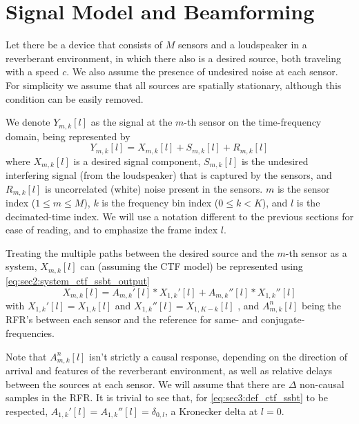 \section{Signal Model and Beamforming}
\label{sec:signal_model}

Let there be a device that consists of $M$ sensors and a loudspeaker in a reverberant environment, in which there also is a desired source, both traveling with a speed $c$. We also assume the presence of undesired noise at each sensor. For simplicity we assume that all sources are spatially stationary, although this condition can be easily removed.

We denote $Y_{m,k}[l]$ as the signal at the $m$-th sensor on the time-frequency domain, being represented by
\begin{equation}
	\label{eq:sec3:system_time-freq_domain_base}
	Y_{m,k}[l] = X_{m,k}[l] + S_{m,k}[l] + R_{m,k}[l]
\end{equation}
where $X_{m,k}[l]$ is a desired signal component, $S_{m,k}[l]$ is the undesired interfering signal (from the loudspeaker) that is captured by the sensors, and $R_{m,k}[l]$ is uncorrelated (white) noise present in the sensors. $m$ is the sensor index ($1 \leq m \leq M$), $k$ is the frequency bin index ($0 \leq k < K$), and $l$ is the decimated-time index. We will use a notation different to the previous sections for ease of reading, and to emphasize the frame index $l$.

Treating the multiple paths between the desired source and the $m$-th sensor as a system, $X_{m,k}[l]$ can (assuming the CTF model) be represented using \cref{eq:sec2:system_ctf_ssbt_output} 
\begin{equation}
	\label{eq:sec3:def_ctf_ssbt}
	X_{m,k}[l] = A_{m,k}'[l] \ast X_{1,k}'[l] + A_{m,k}''[l] \ast X_{1,k}''[l]
\end{equation}
with $X_{1,k}'[l] = X_{1,k}[l]$ and $X_{1,k}''[l] = X_{1,K-k}[l]$ , and $A^n_{m,k}[l]$ being the RFR's between each sensor and the reference for same- and conjugate-frequencies.

Note that $A_{m,k}^n[l]$ isn't strictly a causal response, depending on the direction of arrival and features of the reverberant environment, as well as relative delays between the sources at each sensor. We will assume that there are $\Delta$ non-causal samples in the RFR. It is trivial to see that, for \cref{eq:sec3:def_ctf_ssbt} to be respected, $A_{1,k}'[l] = A_{1,k}''[l] = \delta_{0,l}$, a Kronecker delta at $l=0$.

